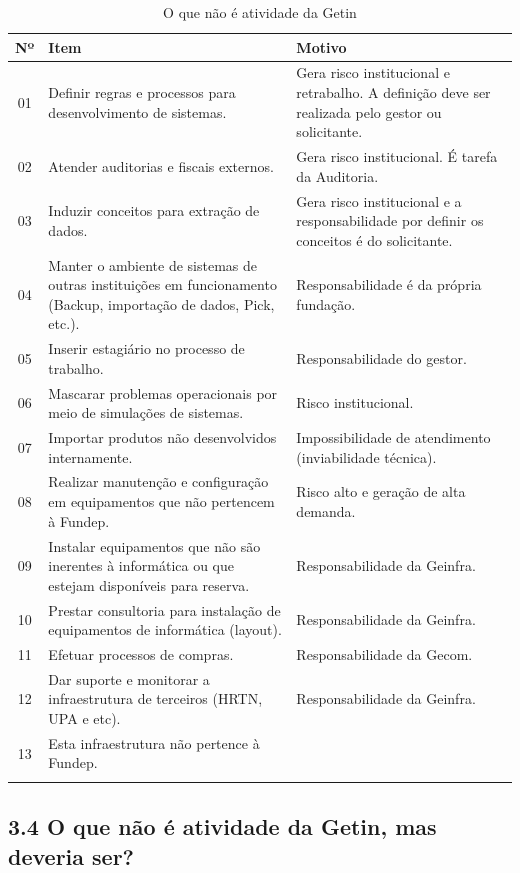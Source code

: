 \documentclass{article}
\begin{document}
\begin{longtable}{|c|p{5cm}|p{8cm}|}
\toprule
Nº & Item & Motivo \\
\midrule
01 & Definir regras e processos para desenvolvimento de sistemas. & Gera risco institucional e retrabalho. A definição deve ser realizada pelo gestor ou solicitante. \\
02 & Atender auditorias e fiscais externos. & Gera risco institucional. É tarefa da Auditoria. \\
03 & Induzir conceitos para extração de dados. & Gera risco institucional e a responsabilidade por definir os conceitos é do solicitante. \\
04 & Manter o ambiente de sistemas de outras instituições em funcionamento (Backup, importação de dados, Pick, etc.). & Responsabilidade é da própria fundação. \\
05 & Inserir estagiário no processo de trabalho. & Responsabilidade do gestor. \\
06 & Mascarar problemas operacionais por meio de simulações de sistemas. & Risco institucional. \\
07 & Importar produtos não desenvolvidos internamente. & Impossibilidade de atendimento (inviabilidade técnica). \\
08 & Realizar manutenção e configuração em equipamentos que não pertencem à Fundep. & Risco alto e geração de alta demanda. \\
09 & Instalar equipamentos que não são inerentes à informática ou que estejam disponíveis para reserva. & Responsabilidade da Geinfra. \\
10 & Prestar consultoria para instalação de equipamentos de informática (layout). & Responsabilidade da Geinfra. \\
11 & Efetuar processos de compras. & Responsabilidade da Gecom. \\
12 & Dar suporte e monitorar a infraestrutura de terceiros (HRTN, UPA e etc). & Responsabilidade da Geinfra. \\
13 & Esta infraestrutura não pertence à Fundep. & \\
\bottomrule
\caption{O que não é atividade da Getin}
\label{tab:nao_atividade_getin}
\end{longtable}

\subsection*{3.4 O que não é atividade da Getin, mas deveria ser?}
\end{document}
